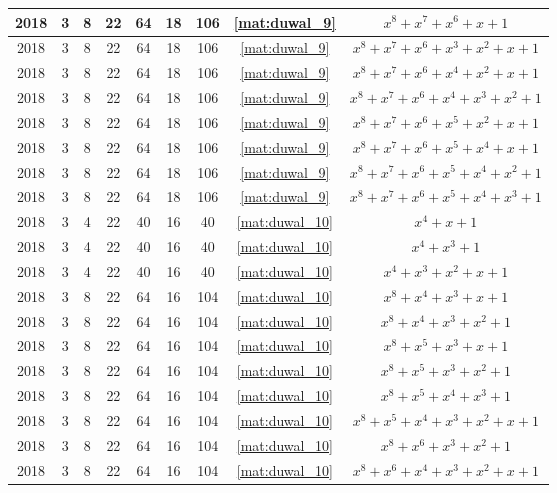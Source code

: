 \begin{longtable}{|c|c|c|c|c|c|c|c|c|}
2018 & 3 & 8 & 22 & 64 & 18 & 106 & \eqref{mat:duwal_9} & $x^8 + x^7 + x^6 + x + 1$ \\ \hline 
2018 & 3 & 8 & 22 & 64 & 18 & 106 & \eqref{mat:duwal_9} & $x^8 + x^7 + x^6 + x^3 + x^2 + x + 1$ \\ \hline 
2018 & 3 & 8 & 22 & 64 & 18 & 106 & \eqref{mat:duwal_9} & $x^8 + x^7 + x^6 + x^4 + x^2 + x + 1$ \\ \hline 
2018 & 3 & 8 & 22 & 64 & 18 & 106 & \eqref{mat:duwal_9} & $x^8 + x^7 + x^6 + x^4 + x^3 + x^2 + 1$ \\ \hline 
2018 & 3 & 8 & 22 & 64 & 18 & 106 & \eqref{mat:duwal_9} & $x^8 + x^7 + x^6 + x^5 + x^2 + x + 1$ \\ \hline 
2018 & 3 & 8 & 22 & 64 & 18 & 106 & \eqref{mat:duwal_9} & $x^8 + x^7 + x^6 + x^5 + x^4 + x + 1$ \\ \hline 
2018 & 3 & 8 & 22 & 64 & 18 & 106 & \eqref{mat:duwal_9} & $x^8 + x^7 + x^6 + x^5 + x^4 + x^2 + 1$ \\ \hline 
2018 & 3 & 8 & 22 & 64 & 18 & 106 & \eqref{mat:duwal_9} & $x^8 + x^7 + x^6 + x^5 + x^4 + x^3 + 1$ \\ \hline 
2018 & 3 & 4 & 22 & 40 & 16 & 40 & \eqref{mat:duwal_10} & $x^4 + x + 1$ \\ \hline 
2018 & 3 & 4 & 22 & 40 & 16 & 40 & \eqref{mat:duwal_10} & $x^4 + x^3 + 1$ \\ \hline 
2018 & 3 & 4 & 22 & 40 & 16 & 40 & \eqref{mat:duwal_10} & $x^4 + x^3 + x^2 + x + 1$ \\ \hline 
2018 & 3 & 8 & 22 & 64 & 16 & 104 & \eqref{mat:duwal_10} & $x^8 + x^4 + x^3 + x + 1$ \\ \hline 
2018 & 3 & 8 & 22 & 64 & 16 & 104 & \eqref{mat:duwal_10} & $x^8 + x^4 + x^3 + x^2 + 1$ \\ \hline 
2018 & 3 & 8 & 22 & 64 & 16 & 104 & \eqref{mat:duwal_10} & $x^8 + x^5 + x^3 + x + 1$ \\ \hline 
2018 & 3 & 8 & 22 & 64 & 16 & 104 & \eqref{mat:duwal_10} & $x^8 + x^5 + x^3 + x^2 + 1$ \\ \hline 
2018 & 3 & 8 & 22 & 64 & 16 & 104 & \eqref{mat:duwal_10} & $x^8 + x^5 + x^4 + x^3 + 1$ \\ \hline 
2018 & 3 & 8 & 22 & 64 & 16 & 104 & \eqref{mat:duwal_10} & $x^8 + x^5 + x^4 + x^3 + x^2 + x + 1$ \\ \hline 
2018 & 3 & 8 & 22 & 64 & 16 & 104 & \eqref{mat:duwal_10} & $x^8 + x^6 + x^3 + x^2 + 1$ \\ \hline 
2018 & 3 & 8 & 22 & 64 & 16 & 104 & \eqref{mat:duwal_10} & $x^8 + x^6 + x^4 + x^3 + x^2 + x + 1$ \\ \hline 

\end{longtable}
